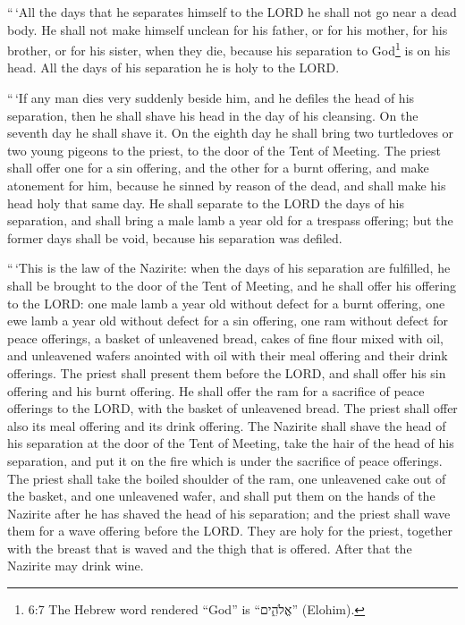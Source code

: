  ``\,`All the days that he separates himself to the LORD he
shall not go near a dead body.  He shall not make himself
unclean for his father, or for his mother, for his brother, or for his
sister, when they die, because his separation to God\footnote{6:7 The
  Hebrew word rendered ``God'' is ``אֱלֹהִ֑ים'' (Elohim).} is on his
head.  All the days of his separation he is holy to the
LORD.

 ``\,`If any man dies very suddenly beside him, and he
defiles the head of his separation, then he shall shave his head in the
day of his cleansing. On the seventh day he shall shave it.
 On the eighth day he shall bring two turtledoves or two
young pigeons to the priest, to the door of the Tent of Meeting.
 The priest shall offer one for a sin offering, and the
other for a burnt offering, and make atonement for him, because he
sinned by reason of the dead, and shall make his head holy that same
day.  He shall separate to the LORD the days of his
separation, and shall bring a male lamb a year old for a trespass
offering; but the former days shall be void, because his separation was
defiled.

 ``\,`This is the law of the Nazirite: when the days of his
separation are fulfilled, he shall be brought to the door of the Tent of
Meeting,  and he shall offer his offering to the LORD: one
male lamb a year old without defect for a burnt offering, one ewe lamb a
year old without defect for a sin offering, one ram without defect for
peace offerings,  a basket of unleavened bread, cakes of
fine flour mixed with oil, and unleavened wafers anointed with oil with
their meal offering and their drink offerings.  The priest
shall present them before the LORD, and shall offer his sin offering and
his burnt offering.  He shall offer the ram for a sacrifice
of peace offerings to the LORD, with the basket of unleavened bread. The
priest shall offer also its meal offering and its drink offering.
 The Nazirite shall shave the head of his separation at the
door of the Tent of Meeting, take the hair of the head of his
separation, and put it on the fire which is under the sacrifice of peace
offerings.  The priest shall take the boiled shoulder of
the ram, one unleavened cake out of the basket, and one unleavened
wafer, and shall put them on the hands of the Nazirite after he has
shaved the head of his separation;  and the priest shall
wave them for a wave offering before the LORD. They are holy for the
priest, together with the breast that is waved and the thigh that is
offered. After that the Nazirite may drink wine.

